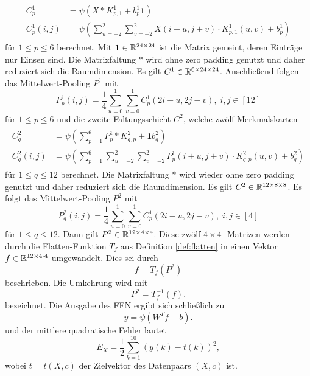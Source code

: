 \begin{align}
    \label{eq:C1_forw}
    \begin{split}
    C_p^1 &= \psi(X \ast K_{p,1}^1+b_p^1 \mathbf{1}) \\
    C_p^1(i,j)&=\psi \left(\sum_{u=-2}^2 \sum_{v=-2}^2 X(i+u,j+v) \cdot K_{p,1}^1(u,v) +b_p^1\right)
    \end{split}
\end{align}
für $1 \leq p \leq 6$ berechnet. Mit $\mathbf{1} \in \mathbb{R}^{24 \times 24}$ ist die Matrix gemeint, deren Einträge nur Einsen sind. Die Matrixfaltung $\ast$ wird ohne zero padding genutzt und daher reduziert sich die Raumdimension. Es gilt $C^1 \in \mathbb{R}^{6 \times 24 \times 24}$. Anschließend folgen das Mittelwert-Pooling $P^1$ mit
\begin{equation}
    \label{eq:P1_forw}
    P^1_p(i,j) =\frac{1}{4} \sum_{u=0}^1 \sum_{v=0}^1 C_p^1(2i-u, 2j-v), \; i,j \in [12]
\end{equation}
für $1 \leq p \leq 6$ und die zweite Faltungsschicht $C^2$, welche zwölf Merkmalskarten
\begin{align}
    \label{eq:C2_forw}
    \begin{split}
        C_q^2 &= \psi \left( \sum_{p=1}^6 P_p^1 \ast K_{q,p}^2 + \mathbf{1} b_q^2\right) \\
        C_q^2(i,j) &= \psi \left( \sum_{p=1}^6 \sum_{u=-2}^2 \sum_{v=-2}^2 P^1_p(i+u,j+v) \cdot K^2_{q,p}(u,v) +b_q^2\right)
    \end{split}
\end{align}
für $1 \leq q \leq 12$ berechnet. Die Matrixfaltung $\ast$ wird wieder ohne zero padding genutzt und daher reduziert sich die Raumdimension.
Es gilt $C^2 \in \mathbb{R}^{12 \times 8 \times 8}$. Es folgt das Mittelwert-Pooling $P^2$ mit
\begin{equation}
    \label{eq:P2_forw}
    P_q^2(i,j)= \frac{1}{4} \sum_{u=0}^1 \sum_{v=0}^1 C_p^1(2i-u, 2j-v), \; i,j \in [4]
\end{equation}
für $1 \leq q \leq 12$. Dann gilt $P^2\in \mathbb{R}^{12 \times 4 \times 4}$. Diese zwölf $4 \times 4$- Matrizen werden durch die Flatten-Funktion $T_f$ aus Definition \ref{def:flatten} in einen Vektor $f \in \mathbb{R}^{12 \times 4 \cdot 4}$ umgewandelt. Dies sei durch
\begin{equation}
    \label{eq:f_forw}
    f=T_f(P^2)
\end{equation}
beschrieben. 
Die Umkehrung wird mit
\begin{equation}
    \label{eq_f_ford_inv}
    P^2=T_f^{-1}(f).
\end{equation}
bezeichnet.
Die Ausgabe des FFN ergibt sich schließlich zu
\begin{equation}
    \label{eq:y_forw}
    y=\psi(W^T f +b).
\end{equation}
und der mittlere quadratische Fehler lautet
\begin{equation}
    \label{eq:E_forw}
    E_{X}=\frac{1}{2} \sum_{k=1}^{10} \left(y(k)-t(k)\right)^2,
\end{equation}
wobei $t=t(X,c)$ der Zielvektor des Datenpaars $(X,c)$ ist.

